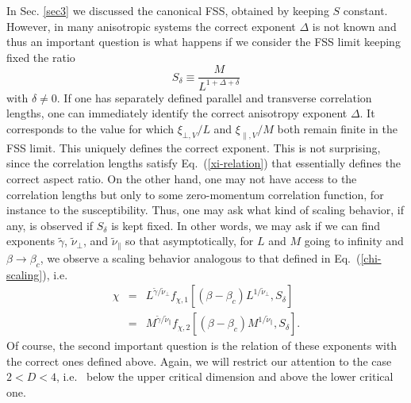 \documentclass[a4paper,12pt]{article}
\begin{document}
In Sec. \ref{sec3} we discussed the canonical FSS, obtained by
keeping $S$ constant. However, in many anisotropic systems the correct
exponent $\Delta$ is not known and thus an important question is
what happens if we consider the FSS limit keeping fixed the ratio
\begin{equation}
S_\delta \equiv \frac{M}{L^{1+\Delta+\delta}}
\label{anomalous-scaling}
\end{equation}
with $\delta\neq 0$. If one has separately defined parallel and 
transverse correlation lengths, one can immediately identify the 
correct anisotropy exponent $\Delta$. It corresponds to the value for 
which $\xi_{\bot,V}/L$ and $\xi_{\|,V}/M$ both remain finite in the 
FSS limit. This uniquely defines the correct exponent. This is not 
surprising, since the correlation lengths satisfy Eq.~(\ref{xi-relation})
that essentially defines the correct aspect ratio. On the other hand,
one may not have access to the correlation lengths but only to some 
zero-momentum correlation function, for instance to the susceptibility. 
Thus, one may ask what kind of scaling behavior, if any, is observed 
if $S_\delta$ is kept fixed. In other words, we may ask if 
we can find exponents $\tilde{\gamma}$, 
$\tilde{\nu}_\bot$, and $\tilde{\nu}_\|$ so that asymptotically,
for $L$ and $M$ going to infinity and $\beta\to\beta_c$, we observe a scaling
behavior analogous to that defined in Eq.~(\ref{chi-scaling}), i.e.
\begin{eqnarray}
\chi &=& L^{\tilde{\gamma}/\tilde{\nu}_\bot} 
   f_{\chi,1}[(\beta - \beta_c) L^{1/\tilde{\nu}_\bot},S_\delta] 
\label{chieff-L} \\
     &=& M^{\tilde{\gamma}/\tilde{\nu}_\|} 
   f_{\chi,2}[(\beta - \beta_c) M^{1/\tilde{\nu}_\|},S_\delta].
\label{chieff-M} 
\end{eqnarray}
Of course, 
the second important question is the relation of these exponents
with the correct ones defined above. Again, we will restrict our attention
to the case $2 < D < 4$, i.e.~ below the upper critical dimension and 
above the lower critical one.
\end{document}
